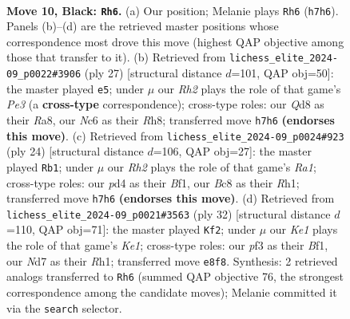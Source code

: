 \documentclass[11pt]{article}
\begin{document}
\clearpage

\begin{figure}[p]\centering
\begin{subfigure}{0.46\textwidth}\centering
\resizebox{\linewidth}{!}{%
\newchessgame
\chessboard[
  setfen={r1bqk3/pp1n1ppr/2n1p3/3pP3/1b1P4/5P2/PPQN2PP/R1B1K1NR b KQq - 2 10},
  showmover=false,
  pgfstyle=straightmove, color=movearrow, markmove={h7-h6}
]}
\caption{}
\end{subfigure}\hfill
\begin{subfigure}{0.46\textwidth}\centering
\resizebox{\linewidth}{!}{%
\newchessgame
\chessboard[
  setfen={r3kb1r/ppnn1ppp/3qp3/1P6/P1PN4/3Q4/1B3PPP/RN2K2R b KQkq - 0 14},
  showmover=false,
  pgfstyle=straightmove, color=movearrow, markmove={e6-e5}
]}
\caption{}
\end{subfigure}
\\[4pt]
\begin{subfigure}{0.46\textwidth}\centering
\resizebox{\linewidth}{!}{%
\newchessgame
\chessboard[
  setfen={rnbqkb1r/5ppp/pP1pp3/6P1/3NP2P/4B3/1pP2P2/R2QKB1R w KQkq - 0 13},
  showmover=false,
  pgfstyle=straightmove, color=movearrow, markmove={a1-b1}
]}
\caption{}
\end{subfigure}\hfill
\begin{subfigure}{0.46\textwidth}\centering
\resizebox{\linewidth}{!}{%
\newchessgame
\chessboard[
  setfen={r1b1k2r/ppp5/2n1p2p/b4p1P/3P2p1/q3PPB1/2RN2P1/3QKB1R w Kkq - 2 17},
  showmover=false,
  pgfstyle=straightmove, color=movearrow, markmove={e1-f2}
]}
\caption{}
\end{subfigure}
\caption{\textbf{Move 10, Black: \texttt{Rh6}.} (a) Our position; Melanie plays \texttt{Rh6} (\texttt{h7h6}). Panels (b)--(d) are the retrieved master positions whose correspondence most drove this move (highest QAP objective among those that transfer to it). (b) Retrieved from \texttt{lichess\_elite\_2024-09\_p0022\#3906} (ply 27) [structural distance $d$=101, QAP obj=50]: the master played \texttt{e5}; under $\mu$ our \emph{Rh2} plays the role of that game's \emph{Pe3} (a \textbf{cross-type} correspondence); cross-type roles: our \emph{Q}d8 as their \emph{R}a8, our \emph{N}c6 as their \emph{R}h8; transferred move \texttt{h7h6} \textbf{(endorses this move)}. (c) Retrieved from \texttt{lichess\_elite\_2024-09\_p0024\#923} (ply 24) [structural distance $d$=106, QAP obj=27]: the master played \texttt{Rb1}; under $\mu$ our \emph{Rh2} plays the role of that game's \emph{Ra1}; cross-type roles: our \emph{p}d4 as their \emph{B}f1, our \emph{B}c8 as their \emph{R}h1; transferred move \texttt{h7h6} \textbf{(endorses this move)}. (d) Retrieved from \texttt{lichess\_elite\_2024-09\_p0021\#3563} (ply 32) [structural distance $d$=110, QAP obj=71]: the master played \texttt{Kf2}; under $\mu$ our \emph{Ke1} plays the role of that game's \emph{Ke1}; cross-type roles: our \emph{p}f3 as their \emph{B}f1, our \emph{N}d7 as their \emph{R}h1; transferred move \texttt{e8f8}. Synthesis: 2 retrieved analogs transferred to \texttt{Rh6} (summed QAP objective 76, the strongest correspondence among the candidate moves); Melanie committed it via the \texttt{search} selector.}
\label{fig:thought-m19}
\end{figure}
\end{document}
